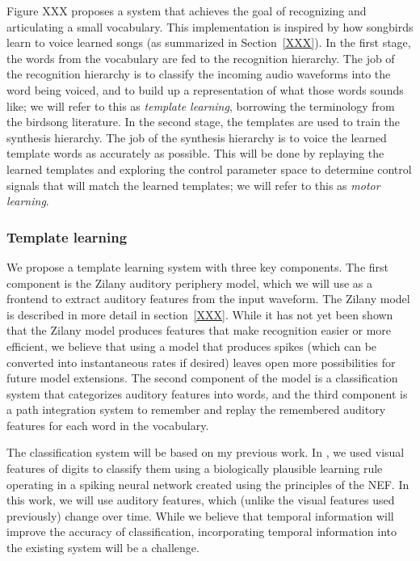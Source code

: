 \documentclass{article}
\begin{document}
Figure XXX proposes a system that
achieves the goal of recognizing
and articulating a small vocabulary.
This implementation is inspired by
how songbirds learn to voice
learned songs
(as summarized in Section~\ref{XXX}).
In the first stage, the words from
the vocabulary are fed to the
recognition hierarchy.
The job of the recognition hierarchy
is to classify the incoming
audio waveforms into the word
being voiced,
and to build up a representation
of what those words sounds like;
we will refer to this as
\textit{template learning},
borrowing the terminology
from the birdsong literature.
In the second stage, the templates
are used to train the
synthesis hierarchy.
The job of the synthesis hierarchy
is to voice the learned template words
as accurately as possible.
This will be done by replaying
the learned templates and
exploring the control parameter space
to determine control signals
that will match the learned templates;
we will refer to this as
\textit{motor learning}.

\subsubsection{Template learning}
\label{subsec:template-learning}

We propose a template learning system
with three key components.
The first component is the Zilany
auditory periphery model,
which we will use as a frontend
to extract auditory features
from the input waveform.
The Zilany model is described in more detail
in section~\ref{XXX}.
While it has not yet been shown
that the Zilany model produces features
that make recognition
easier or more efficient,
we believe that using a model
that produces spikes
(which can be converted into
instantaneous rates if desired)
leaves open more possibilities
for future model extensions.
The second component of the model
is a classification system
that categorizes auditory features into words,
and the third component
is a path integration system
to remember and replay the
remembered auditory features
for each word in the vocabulary.

The classification system will be based
on my previous work.
In \citet{bekolay2013}, we used visual features
of digits to classify them
using a biologically plausible learning rule
operating in a spiking neural network
created using the principles of the NEF.
In this work, we will use auditory features,
which (unlike the visual features used previously)
change over time.
While we believe that temporal information
will improve the accuracy of classification,
incorporating temporal information
into the existing system will be a challenge.
\end{document}
